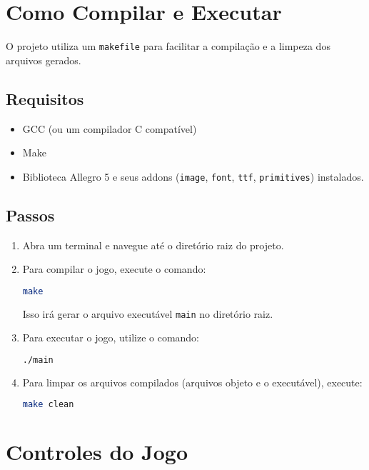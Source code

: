 \documentclass[11pt, a4paper]{article}
\begin{document}
\section{Como Compilar e Executar}

O projeto utiliza um \texttt{makefile} para facilitar a compilação e a limpeza dos arquivos gerados.

\subsection*{Requisitos}
\begin{itemize}
    \item GCC (ou um compilador C compatível)
    \item Make
    \item Biblioteca Allegro 5 e seus addons (\texttt{image}, \texttt{font}, \texttt{ttf}, \texttt{primitives}) instalados.
\end{itemize}

\subsection*{Passos}
\begin{enumerate}
    \item Abra um terminal e navegue até o diretório raiz do projeto.
    
    \item Para compilar o jogo, execute o comando:
    \begin{lstlisting}[language=bash]
make
    \end{lstlisting}
    Isso irá gerar o arquivo executável \texttt{main} no diretório raiz.
    
    \item Para executar o jogo, utilize o comando:
    \begin{lstlisting}[language=bash]
./main
    \end{lstlisting}
    
    \item Para limpar os arquivos compilados (arquivos objeto e o executável), execute:
    \begin{lstlisting}[language=bash]
make clean
    \end{lstlisting}
\end{enumerate}

\section{Controles do Jogo}
\end{document}
